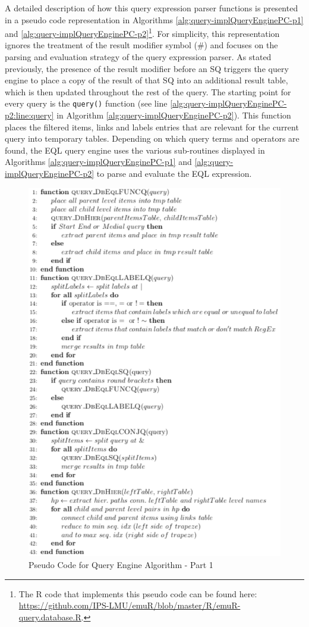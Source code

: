 \documentclass[]{book}
\let\rmarkdownfootnote\footnote%
\def\footnote{\protect\rmarkdownfootnote}
\begin{document}
A detailed description of how this query expression parser functions is presented in a pseudo code representation in Algorithms \ref{alg:query-implQueryEnginePC-p1} and \ref{alg:query-implQueryEnginePC-p2}\footnote{The R code that implements this pseudo code can be found here: \url{https://github.com/IPS-LMU/emuR/blob/master/R/emuR-query.database.R}.}. For simplicity, this representation ignores the treatment of the result modifier symbol (\#) and focuses on the parsing and evaluation strategy of the query expression parser. As stated previously, the presence of the result modifier before an SQ triggers the query engine to place a copy of the result of that SQ into an additional result table, which is then updated throughout the rest of the query. The starting point for every query is the \texttt{query()} function (see line \ref{alg:query-implQueryEnginePC-p2:line:query} in Algorithm \ref{alg:query-implQueryEnginePC-p2}). This function places the filtered items, links and labels entries that are relevant for the current query into temporary tables. Depending on which query terms and operators are found, the EQL query engine uses the various sub-routines displayed in Algorithms \ref{alg:query-implQueryEnginePC-p1} and \ref{alg:query-implQueryEnginePC-p2} to parse and evaluate the EQL expression.

\begin{figure}

{\centering \includegraphics[width=0.9\linewidth]{pics/algorithm1} 

}

\caption{Pseudo Code for Query Engine Algorithm - Part 1}\label{fig:query-implQueryEnginePC-p1}
\end{figure}
\end{document}
